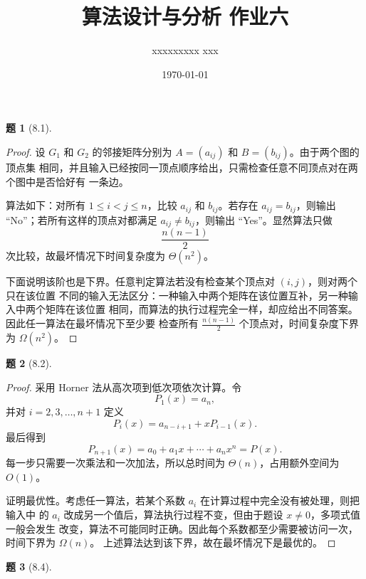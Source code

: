 \documentclass[11pt, a4paper]{article}
\title{算法设计与分析 作业六}
\author{xxxxxxxxx xxx}
\date{\today}
\newtheorem{problem}{题}
\begin{document}
\maketitle

\begin{problem}[8.1]
\end{problem}

\begin{proof}
    设 $G_1$ 和 $G_2$ 的邻接矩阵分别为 $A=(a_{ij})$ 和 $B=(b_{ij})$。由于两个图的顶点集
    相同，并且输入已经按同一顶点顺序给出，只需检查任意不同顶点对在两个图中是否恰好有
    一条边。

    算法如下：对所有 $1\le i<j\le n$，比较 $a_{ij}$ 和 $b_{ij}$。若存在
    $a_{ij}=b_{ij}$，则输出 ``No''；若所有这样的顶点对都满足 $a_{ij}\ne b_{ij}$，则输出
    ``Yes''。显然算法只做
    \[
        \frac{n(n-1)}{2}
    \]
    次比较，故最坏情况下时间复杂度为 $\Theta(n^2)$。

    下面说明该阶也是下界。任意判定算法若没有检查某个顶点对 $(i,j)$，则对两个只在该位置
    不同的输入无法区分：一种输入中两个矩阵在该位置互补，另一种输入中两个矩阵在该位置
    相同，而算法的执行过程完全一样，却应给出不同答案。因此任一算法在最坏情况下至少要
    检查所有 $\frac{n(n-1)}{2}$ 个顶点对，时间复杂度下界为 $\Omega(n^2)$。
\end{proof}

\vspace{1em}

\begin{problem}[8.2]
\end{problem}

\begin{proof}
    采用 Horner 法从高次项到低次项依次计算。令
    \[
        P_1(x)=a_n,
    \]
    并对 $i=2,3,\ldots,n+1$ 定义
    \[
        P_i(x)=a_{n-i+1}+xP_{i-1}(x).
    \]
    最后得到
    \[
        P_{n+1}(x)=a_0+a_1x+\cdots+a_nx^n=P(x).
    \]
    每一步只需要一次乘法和一次加法，所以总时间为 $\Theta(n)$，占用额外空间为 $O(1)$。

    证明最优性。考虑任一算法，若某个系数 $a_i$ 在计算过程中完全没有被处理，则把输入中
    的 $a_i$ 改成另一个值后，算法执行过程不变，但由于题设 $x\ne0$，多项式值一般会发生
    改变，算法不可能同时正确。因此每个系数都至少需要被访问一次，时间下界为 $\Omega(n)$。
    上述算法达到该下界，故在最坏情况下是最优的。
\end{proof}

\vspace{1em}

\begin{problem}[8.4]
\end{problem}
\end{document}
